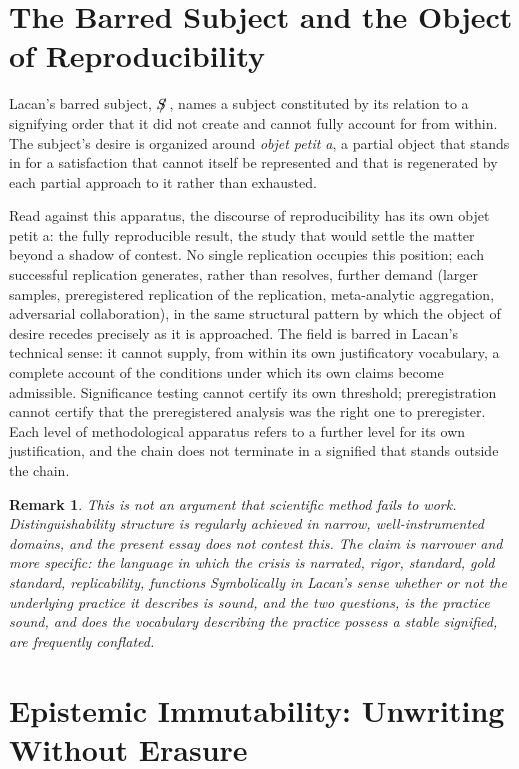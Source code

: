 \documentclass[11pt]{article}
\newcommand{\barredS}{S\mkern-9mu/\,}
\newtheorem{remark}{Remark}
\begin{document}
\section{The Barred Subject and the Object of Reproducibility}

Lacan's barred subject, $\barredS$, names a subject constituted by its relation to a signifying order that it did not create and cannot fully account for from within. The subject's desire is organized around \emph{objet petit a}, a partial object that stands in for a satisfaction that cannot itself be represented and that is regenerated by each partial approach to it rather than exhausted.

Read against this apparatus, the discourse of reproducibility has its own objet petit a: the fully reproducible result, the study that would settle the matter beyond a shadow of contest. No single replication occupies this position; each successful replication generates, rather than resolves, further demand (larger samples, preregistered replication of the replication, meta-analytic aggregation, adversarial collaboration), in the same structural pattern by which the object of desire recedes precisely as it is approached. The field is barred in Lacan's technical sense: it cannot supply, from within its own justificatory vocabulary, a complete account of the conditions under which its own claims become admissible. Significance testing cannot certify its own threshold; preregistration cannot certify that the preregistered analysis was the right one to preregister. Each level of methodological apparatus refers to a further level for its own justification, and the chain does not terminate in a signified that stands outside the chain.

\begin{remark}
This is not an argument that scientific method fails to work. Distinguishability structure is regularly achieved in narrow, well-instrumented domains, and the present essay does not contest this. The claim is narrower and more specific: the \emph{language in which the crisis is narrated}, rigor, standard, gold standard, replicability, functions Symbolically in Lacan's sense whether or not the underlying practice it describes is sound, and the two questions, is the practice sound, and does the vocabulary describing the practice possess a stable signified, are frequently conflated.
\end{remark}

\section{Epistemic Immutability: Unwriting Without Erasure}
\end{document}
